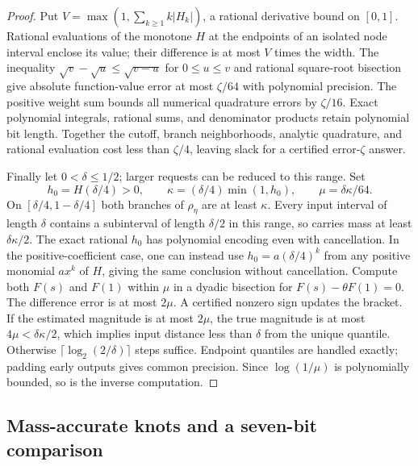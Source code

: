\begin{proof}
Put $V=\max(1,\sum_{k\ge1}k|H_k|)$, a rational derivative bound
on $[0,1]$. Rational evaluations of the monotone $H$ at the endpoints
of an isolated node interval enclose its value; their difference is at
most $V$ times the width. The inequality
$\sqrt v-\sqrt u\le\sqrt{v-u}$ for $0\le u\le v$ and rational
square-root bisection give absolute function-value error at most
$\zeta/64$ with polynomial precision. The positive weight sum bounds
all numerical quadrature errors by $\zeta/16$. Exact polynomial
integrals, rational sums, and denominator products retain polynomial
bit length. Together the cutoff, branch neighborhoods, analytic
quadrature, and rational evaluation cost less than $\zeta/4$, leaving
slack for a certified error-$\zeta$ answer.

Finally let $0<\delta\le1/2$; larger requests can be reduced to this
range. Set
\begin{equation}\label{eq:quantile-inverse-modulus}
 h_0=H(\delta/4)>0,\qquad
 \kappa=(\delta/4)\min(1,h_0),\qquad
 \mu=\delta\kappa/64.
\end{equation}
On $[\delta/4,1-\delta/4]$ both branches of $\rho_\eta$ are at
least $\kappa$. Every input interval of length $\delta$ contains a
subinterval of length $\delta/2$ in this range, so carries mass at
least $\delta\kappa/2$. The exact rational $h_0$ has polynomial
encoding even with cancellation. In the positive-coefficient case,
one can instead use $h_0=a(\delta/4)^k$ from any positive monomial
$a x^k$ of $H$, giving the same conclusion without cancellation.
Compute both $F(s)$ and $F(1)$ within $\mu$ in a dyadic bisection
for $F(s)-\theta F(1)=0$. The difference error is at most $2\mu$.
A certified nonzero sign updates the bracket. If the estimated
magnitude is at most $2\mu$, the true magnitude is at most
$4\mu<\delta\kappa/2$, which implies input distance less than
$\delta$ from the unique quantile. Otherwise
$\lceil\log_2(2/\delta)\rceil$ steps suffice. Endpoint quantiles
are handled exactly; padding early outputs gives common precision.
Since $\log(1/\mu)$ is polynomially bounded, so is the inverse
computation.
\end{proof}

\subsection{Mass-accurate knots and a seven-bit comparison}

